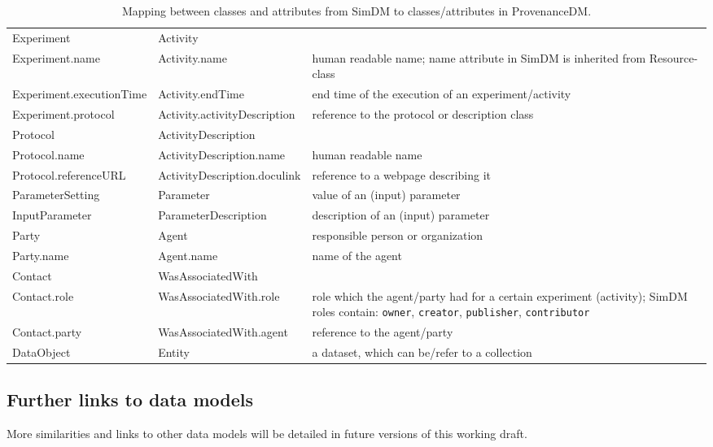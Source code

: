 \begin{table}[h]
\small
{}\textwidth
\begin{tabulary}{1.0\textwidth}{@{}lLp{4cm}@{}}
\toprule
{} &  & \\
\midrule
Experiment      & Activity               & \\
Experiment.name & Activity.name         & human readable name; name attribute in SimDM is inherited from Resource-class\\
Experiment.executionTime  & Activity.endTime & end time of the execution of an experiment/activity \\
Experiment.protocol & Activity.activityDescription & reference to the protocol or description class \\
Protocol        & ActivityDescription    & \\
Protocol.name   & ActivityDescription.name  & human readable name\\
Protocol.referenceURL & ActivityDescription.doculink & reference to a webpage describing it\\
ParameterSetting     & Parameter              & value of an (input) parameter\\
InputParameter       & ParameterDescription              & description of an (input) parameter\\
Party           & Agent                 & responsible person or organization\\
Party.name      & Agent.name & name of the agent \\
Contact         & WasAssociatedWith & \\
Contact.role    & WasAssociatedWith.role & role which the agent/party had for a certain experiment (activity); SimDM roles contain: \texttt{owner}, \texttt{creator}, \texttt{publisher}, \texttt{contributor}\\
Contact.party    & WasAssociatedWith.agent & reference to the agent/party \\
DataObject     & Entity        & a dataset, which can be/refer to a collection\\

\bottomrule
\end{tabulary}
\caption{Mapping between classes and attributes from SimDM to classes/attributes in ProvenanceDM.}
\label{tab:simdmmapping}
\end{table}




\subsection{Further links to data models}
More similarities and links to other data models will be detailed in future 
versions of this working draft.
